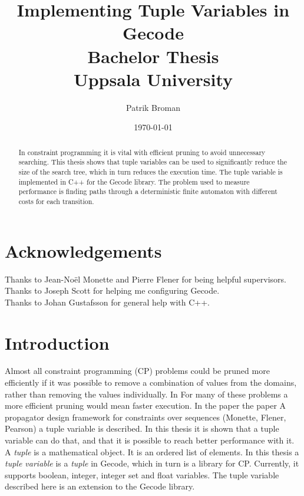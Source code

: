 \documentclass[a4paper,11pt]{article}
\title{\textbf{Implementing Tuple Variables in Gecode\\
	Bachelor Thesis \\
    Uppsala University  \\
  }
}
\author{Patrik Broman}
\date{\today}
\begin{document}
\maketitle

\begin{abstract}
In constraint programming it is vital with efficient pruning to avoid unnecessary searching. This thesis shows that tuple variables can be used to significantly reduce the size of the search tree, which in turn reduces the execution time. The tuple variable is implemented in C++ for the Gecode library. The problem used to measure performance is finding paths through a deterministic finite automaton with different costs for each transition.
\end{abstract}

\setcounter{tocdepth}{2}
\tableofcontents

\section*{Acknowledgements}
Thanks to Jean-No\"{e}l Monette and Pierre Flener for being helpful supervisors. \\
Thanks to Joseph Scott for helping me configuring Gecode. \\
Thanks to Johan Gustafsson for general help with C++. \\

\section{Introduction}
Almost all constraint programming (CP) problems could be pruned more efficiently if it was possible to remove a combination of values from the domains, rather than removing the values individually. In  For many of these problems a more efficient pruning would mean faster execution. In the paper the paper A propagator design framework for constraints over sequences (Monette, Flener, Pearson) a tuple variable is described. In this thesis it is shown that a tuple variable can do that, and that it is possible to reach better performance with it. A \textit{tuple} is a mathematical object. It is an ordered list of elements. In this thesis a \textit{tuple variable} is a \textit{tuple} in Gecode, which in turn is a library for CP. Currently, it supports boolean, integer, integer set and float variables. The tuple variable described here is an extension to the Gecode library.
\end{document}
